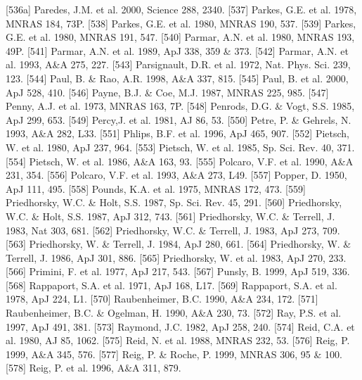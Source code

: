 \documentclass{aa}
\begin{document}
\begin{thebibliography}{}
\bibitem[]{}[536a] Paredes, J.M. et al. 2000, Science 288, 2340.
\bibitem[]{}[537] Parkes, G.E. et al. 1978, MNRAS 184, 73P.
\bibitem[]{}[538] Parkes, G.E. et al. 1980, MNRAS 190, 537.
\bibitem[]{}[539] Parkes, G.E. et al. 1980, MNRAS 191, 547.
\bibitem[]{}[540] Parmar, A.N. et al. 1980, MNRAS 193, 49P.
\bibitem[]{}[541] Parmar, A.N. et al. 1989, ApJ 338, 359 \& 373.
\bibitem[]{}[542] Parmar, A.N. et al. 1993, A\&A 275, 227.
\bibitem[]{}[543] Parsignault, D.R. et al. 1972, Nat. Phys. Sci. 239, 123.
\bibitem[]{}[544] Paul, B. \& Rao, A.R. 1998, A\&A 337, 815.
\bibitem[]{}[545] Paul, B. et al. 2000, ApJ 528, 410.
\bibitem[]{}[546] Payne, B.J. \& Coe, M.J. 1987, MNRAS 225, 985.
\bibitem[]{}[547] Penny, A.J. et al. 1973, MNRAS 163, 7P.
\bibitem[]{}[548] Penrods, D.G. \& Vogt, S.S. 1985, ApJ 299, 653.
\bibitem[]{}[549] Percy,J. et al. 1981, AJ 86, 53.
\bibitem[]{}[550] Petre, P. \& Gehrels, N. 1993, A\&A 282, L33.
\bibitem[]{}[551] Phlips, B.F. et al. 1996, ApJ 465, 907.
\bibitem[]{}[552] Pietsch, W. et al. 1980, ApJ 237, 964.
\bibitem[]{}[553] Pietsch, W. et al. 1985, Sp. Sci. Rev. 40, 371.
\bibitem[]{}[554] Pietsch, W. et al. 1986, A\&A 163, 93.
\bibitem[]{}[555] Polcaro, V.F. et al. 1990, A\&A 231, 354.
\bibitem[]{}[556] Polcaro, V.F. et al. 1993, A\&A 273, L49.
\bibitem[]{}[557] Popper, D. 1950, ApJ 111, 495.
\bibitem[]{}[558] Pounds, K.A. et al. 1975, MNRAS 172, 473.
\bibitem[]{}[559] Priedhorsky, W.C. \& Holt, S.S. 1987, Sp. Sci. Rev. 45, 291.
\bibitem[]{}[560] Priedhorsky, W.C. \& Holt, S.S. 1987, ApJ 312, 743.
\bibitem[]{}[561] Priedhorsky, W.C. \& Terrell, J. 1983, Nat 303, 681.
\bibitem[]{}[562] Priedhorsky, W.C. \& Terrell, J. 1983, ApJ 273, 709.
\bibitem[]{}[563] Priedhorsky, W. \& Terrell, J. 1984, ApJ 280, 661.
\bibitem[]{}[564] Priedhorsky, W. \& Terrell, J. 1986, ApJ 301, 886.
\bibitem[]{}[565] Priedhorsky, W. et al. 1983, ApJ 270, 233.
\bibitem[]{}[566] Primini, F. et al. 1977, ApJ 217, 543.
\bibitem[]{}[567] Punsly, B. 1999, ApJ 519, 336.
\bibitem[]{}[568] Rappaport, S.A. et al. 1971, ApJ 168, L17.
\bibitem[]{}[569] Rappaport, S.A. et al. 1978, ApJ 224, L1.
\bibitem[]{}[570] Raubenheimer, B.C. 1990, A\&A 234, 172.
\bibitem[]{}[571] Raubenheimer, B.C. \& Ogelman, H. 1990, A\&A 230, 73.
\bibitem[]{}[572] Ray, P.S. et al. 1997, ApJ 491, 381.
\bibitem[]{}[573] Raymond, J.C. 1982, ApJ 258, 240.
\bibitem[]{}[574] Reid, C.A. et al. 1980, AJ 85, 1062.
\bibitem[]{}[575] Reid, N. et al. 1988, MNRAS 232, 53.
\bibitem[]{}[576] Reig, P. 1999, A\&A 345, 576.
\bibitem[]{}[577] Reig, P. \& Roche, P. 1999, MNRAS 306, 95 \& 100.
\bibitem[]{}[578] Reig, P. et al. 1996, A\&A 311, 879.

\end{thebibliography}
\end{document}
